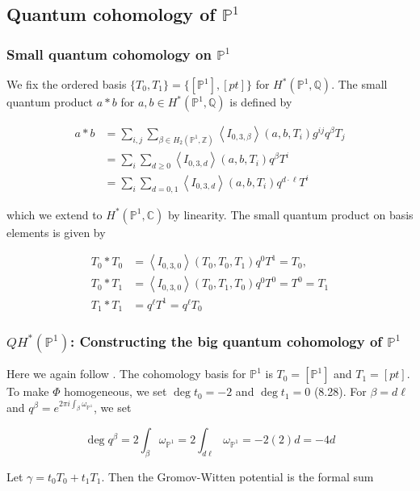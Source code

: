 \documentclass{amsart}
\newcommand{\PP}{\mathbb{P}}\newcommand{\A}{\mathbb{A}}\newcommand{\Z}{\mathbb{Z}}\newcommand{\C}{\mathbb{C}}\newcommand{\N}{\mathbb{N}}\newcommand{\T}{\mathbb{T}}
\newcommand{\Q}{\mathbb{Q}}
\begin{document}
\subsection{Quantum cohomology of $\PP^1$}

\subsubsection{Small quantum cohomology on $\PP^1$}

We fix the ordered basis $\{T_0, T_1\} = \{[\PP^1], [pt]\}$ for $H^*(\PP^1,\Q)$. The small quantum product $a*b$ for $a,b\in H^*(\PP^1,\Q)$ is defined by

\begin{align*}  a*b &= \sum_{i,j} \sum_{\beta\in H_2(\PP^1, \Z)} \left< I_{0,3,\beta} \right>(a,b,T_i)g^{ij}q^\beta T_j\\
&= \sum_i \sum_{d\geq 0} \left< I_{0,3,d} \right> (a,b,T_i) q^\beta T^i\\
&= \sum_i \sum_{d=0,1} \left< I_{0,3,d}\right> (a,b,T_i) q^{d\cdot \ell} T^i
\end{align*} 

which we extend to $H^*(\PP^1, \C)$ by linearity. The small quantum product on basis elements is given by 

\begin{align*}
    T_0 * T_0 &= \left< I_{0,3,0}\right>(T_0, T_0, T_1) q^0 T^1 = T_0,\\
    T_0*T_1 &= \left< I_{0,3,0}\right> (T_0, T_1, T_0) q^0 T^0 = T^0 = T_1\\
    T_1*T_1 &= q^\ell T^1 = q^\ell T_0
\end{align*}





\subsubsection{$QH^*(\PP^1)$: Constructing the big quantum cohomology of $\PP^1$}


Here we again follow \cite{coxkatxMSAG}. The cohomology basis for $\PP^1$ is $T_0 = [\PP^1]$ and $T_1 = [pt]$. To make $\Phi$ homogeneous, we set $\deg t_0 = -2$ and $\deg t_1 = 0$ \cite{coxkatxMSAG} (8.28). For $\beta=d\ell$ and $q^\beta = e^{2\pi i \int_\beta \omega_{\PP^1}}$, we set

\[ \deg q^\beta = 2 \int_\beta \omega_{\PP^1} = 2 \int_{d\ell} \omega_{\PP^1} =-2(2)d = -4d \]


Let $\gamma = t_0T_0 + t_1T_1$. 
Then the Gromov-Witten potential is the formal sum
\end{document}
